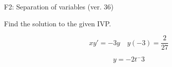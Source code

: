 \begin{exercise}
  \begin{exerciseTitle}F2: Separation of variables (ver. 36)\end{exerciseTitle}
  \begin{exerciseStatement}
    
Find the solution to the given IVP.

    
\[xy'= -3 y \hspace{1em} y( -3 ) = \frac{2}{27}\]

  \end{exerciseStatement}
  \begin{exerciseAnswer}
    
\[y= -2 t^ -3\]

  \end{exerciseAnswer}
\end{exercise}